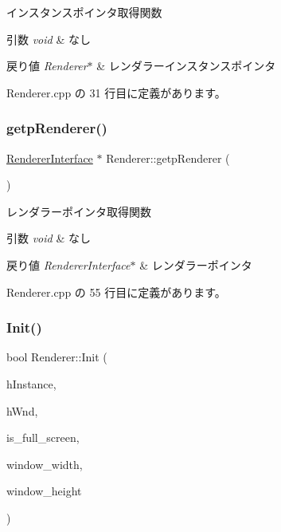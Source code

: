 インスタンスポインタ取得関数 


\begin{DoxyParams}{引数}
{\em void} & なし \\
\hline
\end{DoxyParams}

\begin{DoxyRetVals}{戻り値}
{\em Renderer$\ast$} & レンダラーインスタンスポインタ \\
\hline
\end{DoxyRetVals}


 Renderer.\+cpp の 31 行目に定義があります。

\mbox{\label{class_renderer_a1c49b796eff197f77ef3f75757f7d468}} 
\subsubsection{\texorpdfstring{getp\+Renderer()}{getpRenderer()}}
{\footnotesize\ttfamily \mbox{\hyperlink{class_renderer_interface}{Renderer\+Interface}} $\ast$ Renderer\+::getp\+Renderer (\begin{DoxyParamCaption}{ }\end{DoxyParamCaption})}



レンダラーポインタ取得関数 


\begin{DoxyParams}{引数}
{\em void} & なし \\
\hline
\end{DoxyParams}

\begin{DoxyRetVals}{戻り値}
{\em Renderer\+Interface$\ast$} & レンダラーポインタ \\
\hline
\end{DoxyRetVals}


 Renderer.\+cpp の 55 行目に定義があります。

\mbox{\label{class_renderer_a8d576add80187f5be3f24ec6a8108100}} 
\subsubsection{\texorpdfstring{Init()}{Init()}}
{\footnotesize\ttfamily bool Renderer\+::\+Init (\begin{DoxyParamCaption}\item[{H\+I\+N\+S\+T\+A\+N\+CE}]{h\+Instance,  }\item[{H\+W\+ND}]{h\+Wnd,  }\item[{B\+O\+OL}]{is\+\_\+full\+\_\+screen,  }\item[{int}]{window\+\_\+width,  }\item[{int}]{window\+\_\+height }\end{DoxyParamCaption})}




